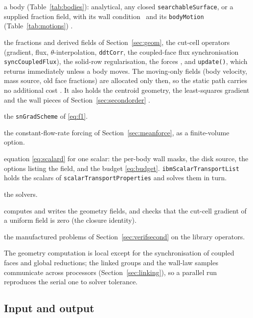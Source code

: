 \documentclass[11pt,a4paper]{article}
\theoremstyle{remark}
\newcommand{\code}[1]{\texttt{#1}}
\begin{document}
\begin{description}\itemsep2pt
\item[\code{ibmBody}] a body (Table~\ref{tab:bodies}): analytical, any closed
      \code{searchableSurface}, or a supplied fraction field, with its wall condition%
      \ and its \code{bodyMotion} (Table~\ref{tab:motions})%
      .
\item[\code{cutCellGeometry}] the fractions and derived fields of Section~\ref{sec:geom}, the
      cut-cell operators (gradient, flux, $\theta$-interpolation, \code{ddtCorr}, the
      coupled-face flux synchronisation \code{syncCoupledFlux}), the
      solid-row regularisation, the forces%
      , and \code{update()}, which returns immediately unless a body moves. The
      moving-only fields (body velocity, mass source, old face fractions) are allocated
      only then, so the static path carries no additional cost%
      . It also holds the centroid geometry, the least-squares gradient and the wall
      pieces of Section~\ref{sec:secondorder}%
      .
\item[\code{cutCellCorrected}] the \code{snGradScheme} of \eqref{eq:f1}.
\item[\code{ibmMeanVelocityForce}] the constant-flow-rate forcing of
      Section~\ref{sec:meanforce}, as a finite-volume option.
\item[\code{ibmScalarTransport}] equation \eqref{eq:scalard} for one scalar: the per-body
      wall masks, the disk source, the options listing the field, and the budget
      \eqref{eq:budget}. \code{ibmScalarTransportList} holds the scalars of
      \code{scalarTransportProperties} and solves them in turn.
\item[\code{ibmSimpleFoam}, \code{ibmPimpleFoam}] the solvers.
\item[\code{ibmSetGeometry}] computes and writes the geometry fields, and checks that the
      cut-cell gradient of a uniform field is zero (the closure identity).
\item[\code{ibmOrderTest}] the manufactured problems of Section~\ref{sec:verifsecond} on the
      library operators.
\end{description}
The geometry computation is local except for the synchronisation of coupled faces and global
reductions; the linked groups and the wall-law samples communicate across processors
(Section~\ref{sec:linking}), so a parallel run reproduces the serial one to solver tolerance.

\subsection{Input and output}
\end{document}

